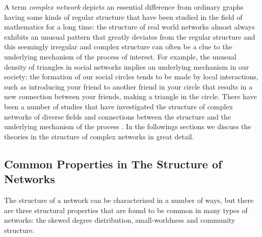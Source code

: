\documentclass[..]{revtex4}
\begin{document}
	A term \textit{complex network} depicts an essential difference from ordinary graphs having some kinds of regular structure that have been studied in the field of mathematics for a long time: the structure of real world networks almost always exhibits an unusual pattern that greatly deviates from the regular structure and this seemingly irregular and complex structure can often be a clue to the underlying mechanism of the process of interest.  For example, the unusual density of triangles in social networks implies an underlying mechanism in our society: the formation of our social circles tends to be made by local interactions, such as introducing your friend to another friend in your circle that results in a new connection between your friends, making a triangle in the circle. There have been a number of studies that have investigated the structure of complex networks of diverse fields and connections between the structure and the underlying mechanism of the process \cite{Strogatz2001, Newman03thestructure, StatisticalMechanics, boccaletti06}. In the followings sections we discuss the theories in the structure of complex networks in great detail.
	
	\subsection{Common Properties in The Structure of Networks}
	The structure of a network can be characterized in a number of ways, but there are three structural properties that are found to be common in many types of networks: the skewed degree distribution, small-worldness and community structure.
	
\end{document}
